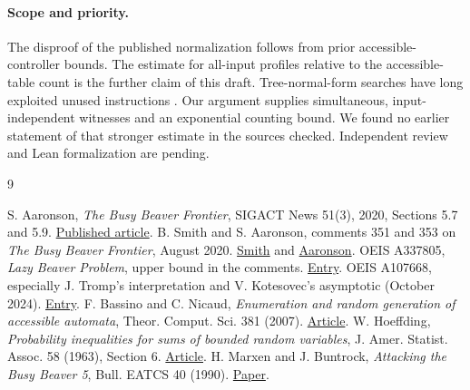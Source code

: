 \documentclass[11pt]{article}
\begin{document}
\paragraph{Scope and priority.}
The disproof of the published normalization follows from prior accessible-controller bounds. The estimate for all-input profiles relative to the accessible-table count is the further claim of this draft. Tree-normal-form searches have long exploited unused instructions \cite{marxen}. Our argument supplies simultaneous, input-independent witnesses and an exponential counting bound. We found no earlier statement of that stronger estimate in the sources checked. Independent review and Lean formalization are pending.

\begin{thebibliography}{9}\raggedright
{} S. Aaronson, \emph{The Busy Beaver Frontier}, SIGACT News 51(3), 2020, Sections 5.7 and 5.9. \href{https://doi.org/10.1145/3427361.3427369}{Published article}.
 B. Smith and S. Aaronson, comments 351 and 353 on \emph{The Busy Beaver Frontier}, August 2020. \href{https://scottaaronson.blog/?p=4916\#comment-1852007}{Smith} and \href{https://scottaaronson.blog/?p=4916\#comment-1852030}{Aaronson}.
 OEIS A337805, \emph{Lazy Beaver Problem}, upper bound in the comments. \href{https://oeis.org/A337805}{Entry}.
 OEIS A107668, especially J. Tromp's interpretation and V. Kotesovec's asymptotic (October 2024). \href{https://oeis.org/A107668}{Entry}.
 F. Bassino and C. Nicaud, \emph{Enumeration and random generation of accessible automata}, Theor. Comput. Sci. 381 (2007). \href{https://www.sciencedirect.com/science/article/pii/S0304397507002861}{Article}.
 W. Hoeffding, \emph{Probability inequalities for sums of bounded random variables}, J. Amer. Statist. Assoc. 58 (1963), Section 6. \href{https://doi.org/10.1080/01621459.1963.10500830}{Article}.
 H. Marxen and J. Buntrock, \emph{Attacking the Busy Beaver 5}, Bull. EATCS 40 (1990). \href{https://www.cs.cmu.edu/~cdm/projects/BusyBeaver/MarxenBuntrock1990-busy-beaver-5.pdf}{Paper}.
\end{thebibliography}
\end{document}
